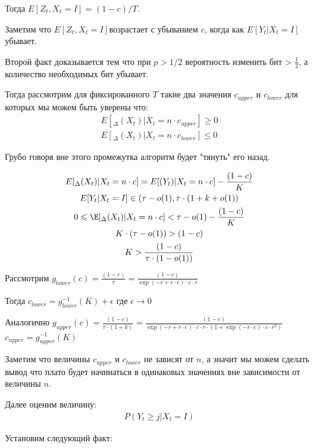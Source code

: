 \documentclass[times]{itmo-student-thesis}
\newcommand{\EY}{E[Y_t| X_t = I]}
\newcommand{\EZdelta}{$E[Z_t, X_t=I]$}
\begin{document}
    Тогда \EZdelta $ = (1 - c)/T$.

    Заметим что \EZdelta возрастает с убыванием $c$, когда как $E[Y_t| X_t = I]$ убывает.

    Второй факт доказывается тем что при $p > 1/2$ вероятность изменить бит > $\frac{1}{2}$, а количество необходимых бит убывает.

    Тогда рассмотрим для фиксированного $T$ такие два значения $c_{upper}$ и $c_{lower}$ для которых мы можем быть уверены что:
    \begin{gather*}
        E[_{\Delta}(X_t)| X_t = n \cdot c_{upper}] \geq 0 \\
        E[_{\Delta}(X_t)| X_t = n \cdot c_{lower}] \leq 0
    \end{gather*}

    Грубо говоря вне этого промежутка алгоритм будет "тянуть" его назад.

    \begin{gather*}
        E[_{\Delta}(X_t)| X_t = n \cdot c] = E[(Y_t)| X_t = n \cdot c] - \frac{(1 - c)}{K} \\
        \EY \in (\tau - o(1), \tau \cdot (1 + k + o(1)) \\
        0 \leq \E[_{\Delta}(X_t)| X_t = n \cdot c] < \tau - o(1) - \frac{(1 - c)}{K} \\
        K \cdot (\tau - o(1)) > (1 - c) \\
        K > \frac{(1 - c)}{\tau \cdot (1 - o(1))}
    \end{gather*}

    Рассмотрим $g_{lower}(c) = \frac{(1 - c)}{\tau} = \frac{(1 - c)}{\exp(-r + r\cdot c) \cdot c \cdot r}$

    Тогда $c_{lower} = g_{lower}^{-1}(K) + \epsilon$ где $\epsilon \rightarrow 0$

    Аналогично $g_{upper}(c) = \frac{(1 - c)}{\tau \cdot (1 + k)} =  \frac{(1 - c)}{\exp(-r + r\cdot c) \cdot c \cdot r \cdot (1 + \exp(-r\cdot c) \cdot c \cdot r^2)}$\\
    $c_{upper} = g_{upper}^{-1}(K)$

    Заметим что величины $c_{upper}$ и $c_{lower}$ не зависят от $n$, а значит мы можем сделать вывод что плато будет начинаться в одинаковых значениях вне зависимости от величины $n$.

    Далее оценим величину:
    \begin{gather*}
        P(Y_t \geq j|X_t = I)
    \end{gather*}

    Установим следующий факт: \\
\end{document}
